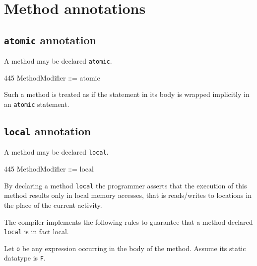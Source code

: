 \section{Method annotations}

\subsection{{\tt atomic} annotation}
A method may be declared {\tt atomic}.
\begin{x10}
445   MethodModifier ::= atomic  
\end{x10}

Such a method is treated as if the statement in its body is wrapped 
implicitly in an {\tt atomic} statement.

\subsection{{\tt local} annotation}\label{LocalAnnotation}
A method may be declared {\tt local}.
\begin{x10}
445   MethodModifier ::= local
\end{x10}

By declaring a method {\tt local} the programmer asserts that the
execution of this method results only in local memory accesses, that
is reads/writes to locations in the place of the current activity.

The compiler implements the following rules to guarantee that a method
declared {\tt local} is in fact local.

Let {\tt o} be any expression occurring in the body of the
method. Assume its static datatype is {\tt F}. 

